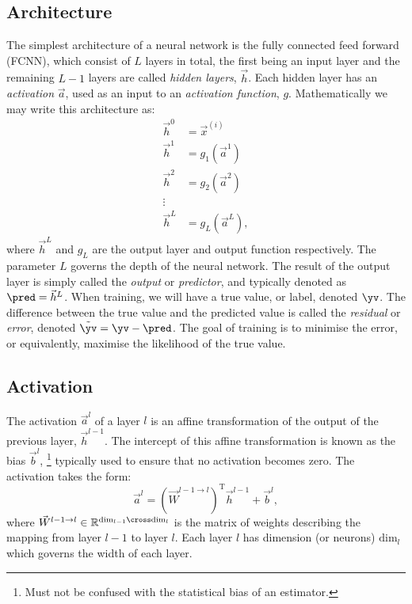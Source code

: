     \subsection{Architecture}
        The simplest architecture of a neural network is the fully connected feed forward (FCNN), which consist of $L$ layers in total, the first being an input layer and the remaining $L-1$ layers are called \textit{hidden layers}, $\vec{h}$. Each hidden layer has an \textit{activation} $\vec{a}$, used as an input to an \textit{activation function}, $g$. Mathematically we may write this architecture as:
        \begin{equation}
            \begin{split}
                \vec{h}^0 &= \vec{x}^{(i)} \\
                \vec{h}^1 &= g_1(\vec{a}^1) \\
                \vec{h}^2 &= g_2(\vec{a}^2) \\
                \vdots & \\
                \vec{h}^{L} &= g_L(\vec{a}^L),
            \end{split}
        \end{equation}
        where $\vec{h}^L$ and $g_L$ are the output layer and output function respectively. The parameter $L$ governs the depth of the neural network. The result of the output layer is simply called the \textit{output} or \textit{predictor}, and typically denoted as $\pred = \vec{h}^L$. When training, we will have a true value, or label, denoted $\yv$. The difference between the true value and the predicted value is called the \textit{residual} or \textit{error}, denoted $\tilde{\yv} = \yv - \pred$. The goal of training is to minimise the error, or equivalently, maximise the likelihood of the true value.
    \subsection{Activation}
        The activation $\vec{a}^l$ of a layer $l$ is an affine transformation of the output of the previous layer, $\vec{h}^{l-1}$. The intercept of this affine transformation is known as the bias $\vec{b}^l$, \footnote{Must not be confused with the statistical bias of an estimator.} typically used to ensure that no activation becomes zero. The activation takes the form:
        \begin{equation}
            \vec{a}^l = (\vec{W}^{l-1\to l})^\mathrm{T}\vec{h}^{l-1} + \vec{b}^l,
        \end{equation}
        where $\vec{W}^{l-1\to l} \in \mathbb{R}^{\mathrm{dim}_{l-1}\cross\mathrm{dim}_l}$ is the matrix of weights describing the mapping from layer $l-1$ to layer $l$. Each layer $l$ has dimension (or neurons) $\mathrm{dim}_l$ which governs the width of each layer. 

